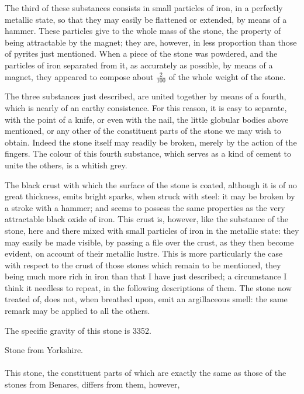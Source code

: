 \documentclass[a4paper, 12pt, oneside, twocolumn]{article}
\begin{document}
The third of these substances consists in small particles of iron, in a perfectly metallic state, so that they may easily be flattened or extended, by means of a hammer. These particles give to the whole mass of the stone, the property of being attractable by the magnet; they are, however, in less proportion than those of pyrites just mentioned. When a piece of the stone was powdered, and the particles of iron separated from it, as accurately as possible, by means of a magnet, they appeared to compose about $\frac{2}{100}$ of the whole weight of the stone.

The three substances just described, are united together by means of a fourth, which is nearly of an earthy consistence. For this reason, it is easy to separate, with the point of a knife, or even with the nail, the little globular bodies above mentioned, or any other of the constituent parts of the stone we may wish to obtain. Indeed the stone itself may readily be broken, merely by the action of the fingers. The colour of this fourth substance, which serves as a kind of cement to unite the others, is a whitish grey.

The black crust with which the surface of the stone is coated, although it is of no great thickness, emits bright sparks, when struck with steel: it may be broken by a stroke with a hammer; and seems to possess the same properties as the very attractable black oxide of iron. This crust is, however, like the substance of the stone, here and there mixed with small particles of iron in the metallic state: they may easily be made visible, by passing a file over the crust, as they then become evident, on account of their metallic lustre. This is more particularly the case with respect to the crust of those stones which remain to be mentioned, they being much more rich in iron than that I have just described; a circumstance I think it needless to repeat, in the following descriptions of them. The stone now treated of, does not, when breathed upon, emit an argillaceous smell: the same remark may be applied to all the others.

The specific gravity of this stone is 3352.
\begin{center}
Stone from Yorkshire.
\end{center}
\paragraph{}
This stone, the constituent parts of which are exactly the same as those of the stones from Benares, differs from them, however,
\end{document}
